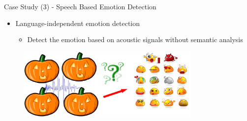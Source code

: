 \documentclass[
 size=14pt,
 paper=smartboard,  %
 mode=present, 		%
 display=slides, 	%
 style=tuliplab,  	%
 pauseslide,
 fleqn,leqno]{powerdot}{}
\begin{document}
\begin{slide}[toc=,bm=]{Case Study (3) - Speech Based Emotion Detection}

\begin{itemize}
  \item Language-independent emotion detection

  \begin{itemize}
    \item Detect the emotion based on acoustic signals without semantic analysis

  \end{itemize}
\end{itemize}

\begin{figure}
  \includegraphics[width=0.8\textwidth]{figures//theme1//Theme1_22.eps}
\end{figure}
%

\end{slide}
\end{document}

